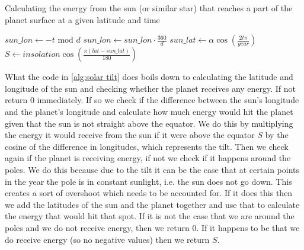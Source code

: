 \begin{algorithm}
    \caption{Calculating the energy from the sun (or similar star) that reaches a part of the planet surface at a given latitude and time}
    \label{alg:solar tilt}
    $sun\_lon \leftarrow -t \text{ mod } d$ \;
    $sun\_lon \leftarrow sun\_lon \cdot \frac{360}{d}$ \;
    $sun\_lat \leftarrow \alpha\cos(\frac{2t\pi}{year})$ \;
    $S \leftarrow insolation\cos(\frac{\pi(lat - sun\_lat)}{180})$ \;

     
\end{algorithm}

What the code in \autoref{alg:solar tilt} does boils down to calculating the latitude and longitude of the sun and checking whether the planet receives any energy. If not return $0$ immediately.
If so we check if the difference between the sun's longitude and the planet's longitude and calculate how much energy would hit the planet given that the sun is not straight above the equator. 
We do this by multiplying the energy it would receive from the sun if it were above the equator $S$ by the cosine of the difference in longitudes, which represents the tilt. Then we check again 
if the planet is receiving energy, if not we check if it happens around the poles. We do this because due to the tilt it can be the case that at certain points in the year the pole is in constant
sunlight, i.e. the sun does not go down. This creates a sort of overshoot which needs to be accounted for. If it does this then we add the latitudes of the sun and the planet together and use
that to calculate the energy that would hit that spot. If it is not the case that we are around the poles and we do not receive energy, then we return $0$. If it happens to be that we do receive 
energy (so no negative values) then we return $S$.